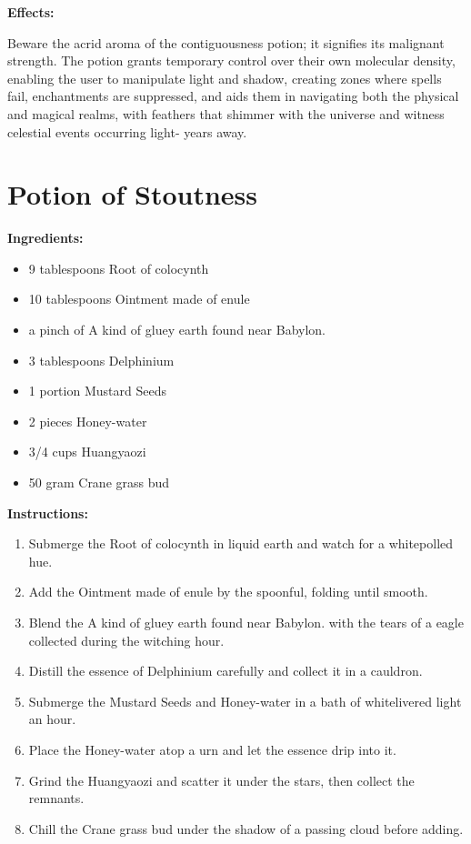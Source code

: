 \documentclass{article}
\begin{document}
\textbf{Effects:}

Beware the acrid aroma of the contiguousness potion; it signifies its malignant strength. The potion grants temporary control over their own molecular density, enabling the user to manipulate light and shadow, creating zones where spells fail, enchantments are suppressed, and aids them in navigating both the physical and magical realms, with feathers that shimmer with the universe and witness celestial events occurring light- years away.

\newpage
\section*{Potion of Stoutness}

\textbf{Ingredients:}

\begin{itemize}
  \item 9 tablespoons Root of colocynth
  \item 10 tablespoons Ointment made of enule
  \item a pinch of A kind of gluey earth found near Babylon.
  \item 3 tablespoons Delphinium
  \item 1 portion Mustard Seeds
  \item 2 pieces Honey-water
  \item 3/4 cups Huangyaozi
  \item 50 gram Crane grass bud
\end{itemize}

\textbf{Instructions:}

\begin{enumerate}
  \item Submerge the Root of colocynth in liquid earth and watch for a whitepolled hue.
  \item Add the Ointment made of enule by the spoonful, folding until smooth.
  \item Blend the A kind of gluey earth found near Babylon. with the tears of a eagle collected during the witching hour.
  \item Distill the essence of Delphinium carefully and collect it in a cauldron.
  \item Submerge the Mustard Seeds and Honey-water in a bath of whitelivered light an hour.
  \item Place the Honey-water atop a urn and let the essence drip into it.
  \item Grind the Huangyaozi and scatter it under the stars, then collect the remnants.
  \item Chill the Crane grass bud under the shadow of a passing cloud before adding.
\end{enumerate}
\end{document}
